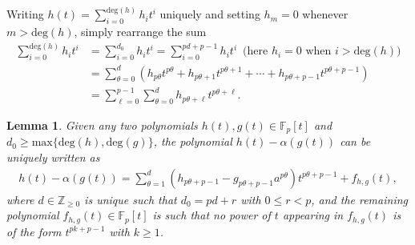 \documentclass[a4paper,11pt]{amsart}
\makeatletter
\numberwithin{equation}{section}
\theoremstyle{plain}
\newtheorem{lem}[thm]{Lemma}
\theoremstyle{definition}
\renewenvironment{proof}[1][\proofname] {\par\pushQED{\qed}\normalfont\topsep6\p@\@plus6\p@\relax\trivlist\item[\hskip\labelsep\bfseries#1\@addpunct{.}]\ignorespaces}{\popQED\endtrivlist\@endpefalse}
\newcommand{\Z}{\mathbb{Z}}
\newcommand{\F}{\mathbb{F}}
\makeatother
\begin{document}
\begin{proof}
Writing $h(t) = \sum_{i=0}^{\mathrm{deg}(h)}h_i t^i$ uniquely and setting $h_{m} = 0$ whenever $m > \mathrm{deg}(h)$, simply rearrange the sum 
\begin{align*}
\sum_{i=0}^{\mathrm{deg}(h)}h_i t^i &= \sum_{i=0}^{d_0}h_i t^i = \sum_{i=0}^{pd+p-1}h_i t^i \, \text{ (here } h_i=0 \text{ when } i>\mathrm{deg}(h)\text{)} \\
&=\sum_{\theta=0}^{d}\left( h_{p\theta}t^{p\theta}+h_{p\theta+1}t^{p\theta+1}+\cdots+h_{p\theta+p-1}t^{p\theta+p-1} \right) \\ 
&= \sum_{\ell = 0}^{p-1} \sum_{\theta=0}^{d} h_{p\theta+\ell}t^{p\theta+\ell}.
\end{align*}
\end{proof}

\begin{lem} \label{claimFpt} Given any two polynomials $h(t), g(t) \in \F_p[t]$ and $d_0 \geq \mathrm{max}\{\mathrm{deg}(h),\mathrm{deg}(g)\}$, the polynomial $h(t) - \alpha(g(t))$ can be uniquely written as
\begin{align*}
h(t) - \alpha(g(t))=\sum_{\theta=1}^{d}( h_{p\theta+p-1} - g_{p\theta+p-1}a^{p\theta})t^{p\theta+p-1} + f_{h,g}(t),
\end{align*}
where $d \in \Z_{\geq 0}$ is unique such that $d_0 = pd+r$ with $0 \leq r < p$, and the remaining polynomial $f_{h,g}(t) \in \F_p[t]$ is such that \emph{no} power of $t$ appearing in $f_{h,g}(t)$ is of the form $t^{pk+p-1}$ with $k\geq 1$. 
\end{lem}
\end{document}
